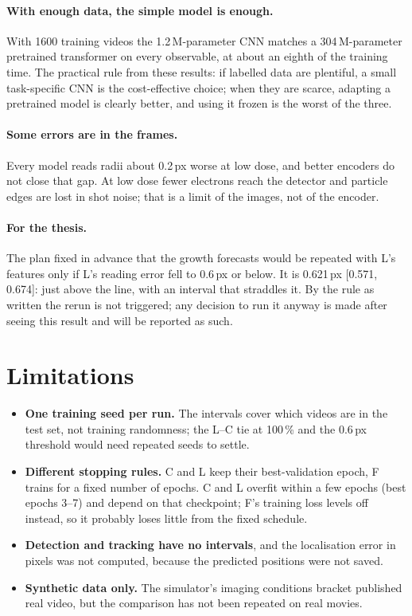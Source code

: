 \documentclass[11pt,a4paper]{article}
\newcommand{\F}{\textsf{F}}
\newcommand{\C}{\textsf{C}}
\newcommand{\Lo}{\textsf{L}}
\begin{document}
\paragraph{With enough data, the simple model is enough.} With 1600 training videos
the 1.2\,M-parameter CNN matches a 304\,M-parameter pretrained transformer on every
observable, at about an eighth of the training time. The practical rule from these
results: if labelled data are plentiful, a small task-specific CNN is the cost-effective
choice; when they are scarce, adapting a pretrained model is clearly better, and using
it frozen is the worst of the three.

\paragraph{Some errors are in the frames.} Every model reads radii about 0.2\,px worse at
low dose, and better encoders do not close that gap. At low dose fewer electrons
reach the detector and particle edges are lost in shot noise; that is a limit of the
images, not of the encoder.

\paragraph{For the thesis.} The plan fixed in advance that the growth forecasts would be
repeated with \Lo{}'s features only if \Lo{}'s reading error fell to 0.6\,px or below.
It is 0.621\,px [0.571, 0.674]: just above the line, with an interval that straddles it.
By the rule as written the rerun is not triggered; any decision to run it anyway is made
after seeing this result and will be reported as such.

\section{Limitations}

\begin{itemize}
  \item \textbf{One training seed per run.} The intervals cover which videos are in the
        test set, not training randomness; the \Lo{}--\C{} tie at 100\,\% and the
        0.6\,px threshold would need repeated seeds to settle.
  \item \textbf{Different stopping rules.} \C{} and \Lo{} keep their best-validation
        epoch, \F{} trains for a fixed number of epochs. \C{} and \Lo{} overfit within a
        few epochs (best epochs 3--7) and depend on that checkpoint; \F{}'s training loss
        levels off instead, so it probably loses little from the fixed schedule.
  \item \textbf{Detection and tracking have no intervals}, and the localisation error in
        pixels was not computed, because the predicted positions were not saved.
  \item \textbf{Synthetic data only.} The simulator's imaging conditions bracket
        published real video, but the comparison has not been repeated on real movies.
\end{itemize}
\end{document}
